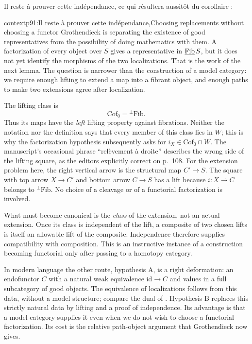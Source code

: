 Il reste à prouver cette indépendance,
ce qui résultera aussitôt du corollaire :

\begin{dcomment}{context}{p91:Il reste à prouver cette indépendance,}{Choosing replacements without choosing a functor}
Grothendieck is separating the existence of good representatives from the possibility of doing mathematics with them. A factorization of every object over $S$ gives a representative in $\underline{\mathrm{Fib}}\, S$, but it does not yet identify the morphisms of the two localizations. That is the work of the next lemma. The question is narrower than the construction of a model category: we require enough lifting to extend a map into a fibrant object, and enough paths to make two extensions agree after localization.

The lifting class is
\[
 \mathrm{Cof}_0={}^{\perp}\mathrm{Fib}.
\]
Thus its maps have the \emph{left} lifting property against fibrations. Neither the notation nor the definition says that every member of this class lies in $W$; this is why the factorization hypothesis subsequently asks for $i_X\in\mathrm{Cof}_0\cap W$. The manuscript's occasional phrase ``relèvement à droite'' describes the wrong side of the lifting square, as the editors explicitly correct on p.~108. For the extension problem here, the right vertical arrow is the structural map $C'\to S$. The square with top arrow $X\to C'$ and bottom arrow $C\to S$ has a lift because $i:X\to C$ belongs to ${}^{\perp}\mathrm{Fib}$. No choice of a cleavage or of a functorial factorization is involved.

What must become canonical is the \emph{class} of the extension, not an actual extension. Once its class is independent of the lift, a composite of two chosen lifts is itself an allowable lift of the composite. Independence therefore supplies compatibility with composition. This is an instructive instance of a construction becoming functorial only after passing to a homotopy category.

In modern language the other route, hypothesis A, is a right deformation: an endofunctor $C$ with a natural weak equivalence $\mathrm{id}\to C$ and values in a full subcategory of good objects. The equivalence of localizations follows from this data, without a model structure; compare the dual of \citet[Definition~2.2.1 and Remark~2.2.2]{Riehl2014}. Hypothesis B replaces this strictly natural data by lifting and a proof of independence. Its advantage is that a model category supplies it even when we do not wish to choose a functorial factorization. Its cost is the relative path-object argument that Grothendieck now gives.
\end{dcomment}


